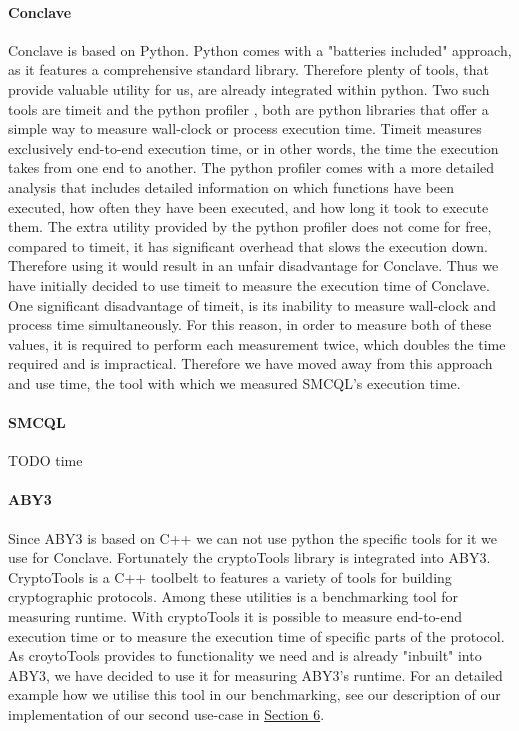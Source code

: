\paragraph{Conclave}
Conclave is based on Python. Python comes with a "batteries included" approach, as it features a comprehensive standard library. Therefore plenty of tools, that provide valuable utility for us, are already integrated within python. Two such tools are timeit \cite{time} and the python profiler \cite{cProfile}, both are python libraries that offer a simple way to measure wall-clock or process execution time. Timeit measures exclusively end-to-end execution time, or in other words, the time the execution takes from one end to another. The python profiler comes with a more detailed analysis that includes detailed information on which functions have been executed, how often they have been executed, and how long it took to execute them. The extra utility provided by the python profiler does not come for free, compared to timeit, it has significant overhead that slows the execution down. Therefore using it would result in an unfair disadvantage for Conclave. Thus we have initially decided to use timeit to measure the execution time of Conclave. One significant disadvantage of timeit, is its inability to measure wall-clock and process time simultaneously. For this reason, in order to measure both of these values, it is required to perform each measurement twice, which doubles the time required and is impractical. Therefore we have moved away from this approach and use time, the tool with which we measured SMCQL's execution time.  
\paragraph{SMCQL}

TODO time \cite{time_sh}
\paragraph{ABY3}
Since ABY3 is based on C++ we can not use python the specific tools for it we use for Conclave. Fortunately the cryptoTools library \cite{cryotoTools} is integrated into ABY3. CryptoTools is a C++ toolbelt to features a variety of tools for building cryptographic protocols. Among these utilities is a benchmarking tool for measuring runtime. With cryptoTools it is possible to measure end-to-end execution time or to measure the execution time of specific parts of the protocol. As croytoTools provides to functionality we need and is already "inbuilt" into ABY3, we have decided to use it for measuring ABY3's runtime. For an detailed example how we utilise this tool in our benchmarking, see our description of our implementation of our second use-case in \hyperref[Implemetation]{Section 6}.




